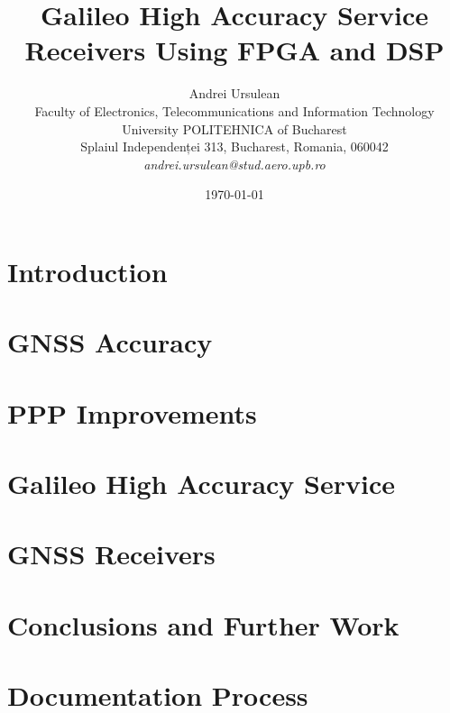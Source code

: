 \documentclass[12pt]{article}
\title{Galileo High Accuracy Service Receivers Using FPGA and DSP}
\author{Andrei Ursulean\\
Faculty of Electronics, Telecommunications and Information Technology\\
University POLITEHNICA of Bucharest\\
Splaiul Independenței 313, Bucharest, Romania, 060042 \\
\emph{andrei.ursulean@stud.aero.upb.ro}}
\date{\today}
\begin{document}
\maketitle

\begin{abstract}

\end{abstract}

\section{Introduction}
\label{sec:introduction}


% 

\section{GNSS Accuracy}
\label{sec:gnssaccuracy}


\section{PPP Improvements}
\label{sec:gnssppp}

 
\section{Galileo High Accuracy Service}
\label{sec:galileohas}

\FloatBarrier

\section{GNSS Receivers}
\label{sec:gnssreceivers}

\FloatBarrier

\section{Conclusions and Further Work}
\label{sec:conclusion}


\section{Documentation Process}
\label{sec:documentation}




\end{document}
